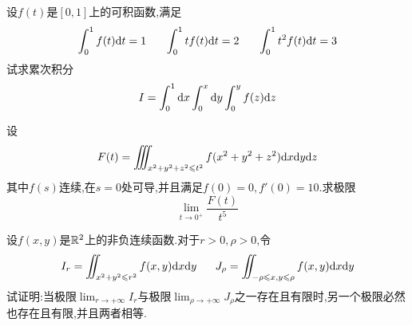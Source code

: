 \documentclass{ctexart}
\begin{document}
\begin{problem}[5.(12\songti{分})]
    设$f(t)$是$[0,1]$上的可积函数,满足
    \[\int_0^1f(t)\di t=1\ \ \ \ \ \int_0^1tf(t)\di t=2\ \ \ \ \ \int_0^1t^2f(t)\di t=3\]
    试求累次积分
    \[I=\int_0^1\mathrm{d} x\int_0^x\mathrm{d} y\int_0^yf(z)\mathrm{d} z\]

\end{problem}

\begin{problem}[6.(10\songti{分})]
    设
    \[F(t)=\iiint_{x^2+y^2+z^2\leqslant t^2}f(x^2+y^2+z^2)\mathrm{d} x\mathrm{d} y\mathrm{d} z\]
    其中$f(s)$连续,在$s=0$处可导,并且满足$f(0)=0,f'(0)=10$.求极限
    \[\lim_{t\to0^+}\dfrac{F(t)}{t^5}\]

\end{problem}
\begin{problem}[7.(10\songti{分})]
    设$f(x,y)$是$\mathbb{R}^2$上的非负连续函数.对于$r>0,\rho>0$,令
    \[I_r=\iint_{x^2+y^2\leqslant r^2}f(x,y)\mathrm{d} x\mathrm{d} y\ \ \ \ \ J_{\rho}=\iint_{-\rho\leqslant x,y\leqslant\rho}f(x,y)\mathrm{d} x\mathrm{d} y\]
    试证明:当极限$\lim_{r\to+\infty}I_r$与极限$\lim_{\rho\to+\infty}J_\rho$之一存在且有限时,另一个极限必然也存在且有限,并且两者相等.
\end{problem}
\end{document}
